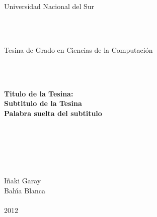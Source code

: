 
\vspace{3cm}

%

\begin{center}
\thispagestyle{empty}

\

\

\

\

\hspace{-5cm} %


\

{\Large {\sc Universidad Nacional del Sur}}\\

\

\

{\Large {\sc Tesina de Grado en Ciencias de la Computaci\'on}}\\


\

\

{\Large {\bf Titulo de la Tesina:}}\\ 
\vspace{2mm}
{\Large {\bf Subtitulo de la Tesina}} \\
\vspace{1mm}
{\Large {\bf Palabra suelta del subtitulo}}

\

\

\

{\Large I\~{n}aki Garay}\\
\vspace{4cm}
{\Large {\sc Bah\'\i a Blanca}\hspace{6cm}{\sc Argentina}}\\
\ \\
{\Large 2012}\ 

\end{center}

\break
